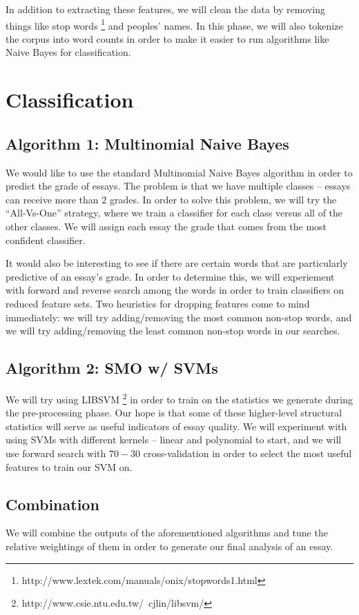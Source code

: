 \documentclass[11pt,twocolumn]{scrartcl}
\begin{document}
In addition to extracting these features, we will clean the data by removing things like stop words \footnote{http://www.lextek.com/manuals/onix/stopwords1.html} and peoples' names. In this phase, we will also tokenize the corpus into word counts in order to make it easier to run algorithms like Naive Bayes for classification.


\section{Classification}

\subsection{Algorithm 1: Multinomial Naive Bayes}
We would like to use the standard Multinomial Naive Bayes algorithm in order to predict the grade of essays. The problem is that we have multiple classes -- essays can receive more than $2$ grades. In order to solve this problem, we will try the ``All-Vs-One'' strategy, where we train a classifier for each class versus all of the other classes. We will assign each essay the grade that comes from the most confident classifier.

It would also be interesting to see if there are certain words that are particularly predictive of an essay's grade. In order to determine this, we will experiement with forward and reverse search among the words in order to train classifiers on reduced feature sets. Two heuristics for dropping features come to mind immediately: we will try adding/removing the most common non-stop words, and we will try adding/removing the least common non-stop words in our searches.

\subsection{Algorithm 2: SMO w/ SVMs}
We will try using LIBSVM \footnote{http://www.csie.ntu.edu.tw/~cjlin/libsvm/} in order to train on the statistics we generate during the pre-processing phase. Our hope is that some of these higher-level structural statistics will serve as useful indicators of essay quality. We will experiment with using SVMs with different kernels -- linear and polynomial to start, and we will use forward search with $70-30$ cross-validation in order to select the most useful features to train our SVM on.

\subsection{Combination}
We will combine the outputs of the aforementioned algorithms and tune the relative weightings of them in order to generate our final analysis of an essay. 
\end{document}
